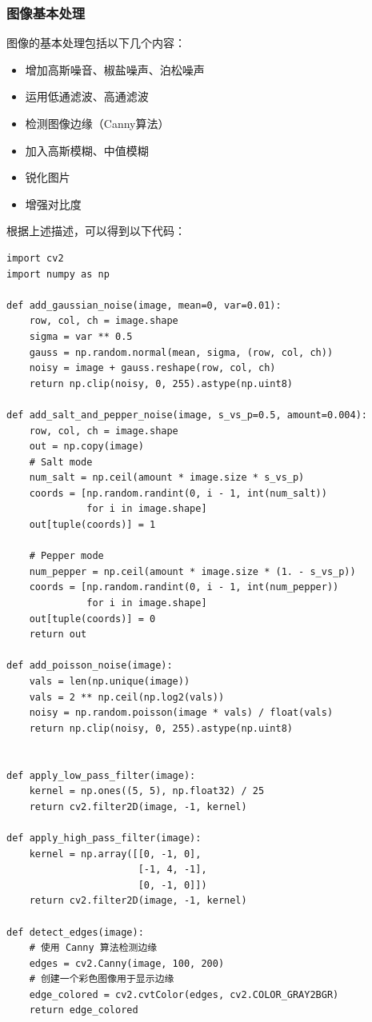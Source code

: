 \documentclass[a4paper,12pt]{article}
\begin{document}
\clearpage
\subsubsection{图像基本处理}
图像的基本处理包括以下几个内容：
\begin{itemize}
    \item 增加高斯噪音、椒盐噪声、泊松噪声
    \item 运用低通滤波、高通滤波
    \item 检测图像边缘（Canny算法）
    \item 加入高斯模糊、中值模糊
    \item 锐化图片
    \item 增强对比度
\end{itemize}

根据上述描述，可以得到以下代码：
\begin{lstlisting}[style=python]
import cv2
import numpy as np

def add_gaussian_noise(image, mean=0, var=0.01):
    row, col, ch = image.shape
    sigma = var ** 0.5
    gauss = np.random.normal(mean, sigma, (row, col, ch))
    noisy = image + gauss.reshape(row, col, ch)
    return np.clip(noisy, 0, 255).astype(np.uint8)

def add_salt_and_pepper_noise(image, s_vs_p=0.5, amount=0.004):
    row, col, ch = image.shape
    out = np.copy(image)
    # Salt mode
    num_salt = np.ceil(amount * image.size * s_vs_p)
    coords = [np.random.randint(0, i - 1, int(num_salt))
              for i in image.shape]
    out[tuple(coords)] = 1

    # Pepper mode
    num_pepper = np.ceil(amount * image.size * (1. - s_vs_p))
    coords = [np.random.randint(0, i - 1, int(num_pepper))
              for i in image.shape]
    out[tuple(coords)] = 0
    return out

def add_poisson_noise(image):
    vals = len(np.unique(image))
    vals = 2 ** np.ceil(np.log2(vals))
    noisy = np.random.poisson(image * vals) / float(vals)
    return np.clip(noisy, 0, 255).astype(np.uint8)


def apply_low_pass_filter(image):
    kernel = np.ones((5, 5), np.float32) / 25
    return cv2.filter2D(image, -1, kernel)

def apply_high_pass_filter(image):
    kernel = np.array([[0, -1, 0],
                       [-1, 4, -1],
                       [0, -1, 0]])
    return cv2.filter2D(image, -1, kernel)

def detect_edges(image):
    # 使用 Canny 算法检测边缘
    edges = cv2.Canny(image, 100, 200)
    # 创建一个彩色图像用于显示边缘
    edge_colored = cv2.cvtColor(edges, cv2.COLOR_GRAY2BGR)
    return edge_colored



\end{lstlisting}
\end{document}

